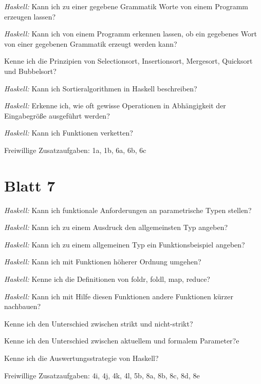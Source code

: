 \documentclass{article}
\newcommand*{\thecheckbox}{\hss[\hss]}
\newenvironment*{checklist} 
{\list{}{\itemsep -2pt 
\renewcommand*{\makelabel}[1]{\thecheckbox}}} 
{\endlist}
\begin{document}
\begin{checklist}
  \item \emph{Haskell:} Kann ich zu einer gegebene Grammatik Worte von einem Programm erzeugen lassen?
  \item \emph{Haskell:} Kann ich von einem Programm erkennen lassen, ob ein gegebenes Wort von einer gegebenen Grammatik erzeugt werden kann?
  \item Kenne ich die Prinzipien von Selectionsort, Insertionsort, Mergesort, Quicksort und Bubbelsort?
  \item \emph{Haskell:} Kann ich Sortieralgorithmen in Haskell beschreiben?
  \item \emph{Haskell:} Erkenne ich, wie oft gewisse Operationen in Abhängigkeit der Eingabegröße ausgeführt werden?
  \item \emph{Haskell:} Kann ich Funktionen verketten?
\end{checklist}

Freiwillige Zusatzaufgaben: 1a, 1b, 6a, 6b, 6c

\section{Blatt 7}

\begin{checklist}
  \item \emph{Haskell:} Kann ich funktionale Anforderungen an parametrische Typen stellen?
  \item \emph{Haskell:} Kann ich zu einem Ausdruck den allgemeinsten Typ angeben?
  \item \emph{Haskell:} Kann ich zu einem allgemeinen Typ ein Funktionsbeispiel angeben?
  \item \emph{Haskell:} Kann ich mit Funktionen höherer Ordnung umgehen?
  \item \emph{Haskell:} Kenne ich die Definitionen von foldr, foldl, map, reduce?
  \item \emph{Haskell:} Kann ich mit Hilfe diesen Funktionen andere Funktionen kürzer nachbauen?
  \item Kenne ich den Unterschied zwischen strikt und nicht-strikt?
  \item Kenne ich den Unterschied zwischen aktuellem und formalem Parameter?e
  \item Kenne ich die Auswertungsstrategie von Haskell?
  \item 
\end{checklist}

Freiwillige Zusatzaufgaben: 4i, 4j, 4k, 4l, 5b, 8a, 8b, 8c, 8d, 8e
\end{document}
